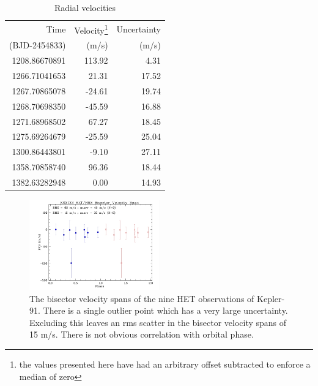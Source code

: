 \documentclass[apjl]{emulateapj}
\begin{document}
\begin{table}\label{tab:rv}
\centering
\caption{Radial velocities}
\begin{tabular}{r r r}
Time & Velocity\footnote{the values presented here have had an arbitrary offset subtracted to enforce a median of zero}  & Uncertainty \\
(BJD-2454833) & (m/s) & (m/s)\\
\hline
1208.86670891	&	113.92 & 4.31\\
1266.71041653	& 21.31&17.52\\
1267.70865078		&	-24.61 &19.74\\
1268.70698350		&	-45.59&16.88\\
1271.68968502		&	67.27&18.45\\
1275.69264679	&	-25.59&25.04\\
1300.86443801 & -9.10&27.11\\
1358.70858740 & 96.36&18.44\\
1382.63282948 & 0.00&14.93\\
\hline
\end{tabular}
\end{table}


\begin{figure}
\includegraphics[width=0.50\textwidth]{k02133_bvs_phas1.jpg}
\caption{The bisector velocity spans of the nine HET observations of Kepler-91. There is a single outlier point which has a very large uncertainty. Excluding this leaves an rms scatter in the bisector velocity spans of 15 m/s. There is not obvious correlation with orbital phase.}
\label{fig:bisectors}
\end{figure}
\end{document}
